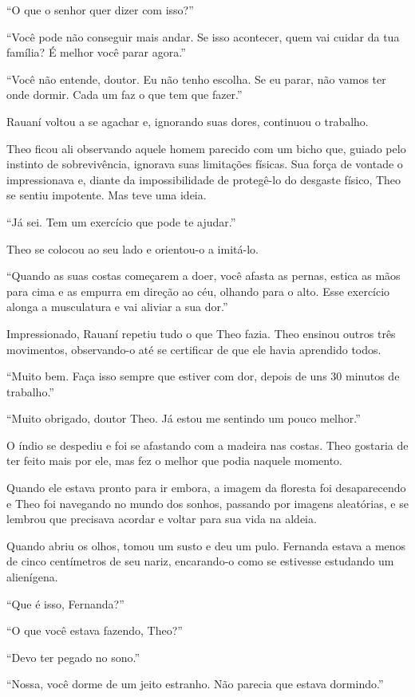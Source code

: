 ``O que o senhor quer dizer com isso?''

``Você pode não conseguir mais andar. Se isso acontecer, quem vai cuidar
da tua família? É melhor você parar agora.''

``Você não entende, doutor. Eu não tenho escolha. Se eu parar, não vamos
ter onde dormir. Cada um faz o que tem que fazer.''

Rauaní voltou a se agachar e, ignorando suas dores, continuou o
trabalho.

Theo ficou ali observando aquele homem parecido com um bicho que, guiado
pelo instinto de sobrevivência, ignorava suas limitações físicas. Sua
força de vontade o impressionava e, diante da impossibilidade de
protegê-lo do desgaste físico, Theo se sentiu impotente. Mas teve uma
ideia.

``Já sei. Tem um exercício que pode te ajudar.''

Theo se colocou ao seu lado e orientou-o a imitá-lo.

``Quando as suas costas começarem a doer, você afasta as pernas, estica
as mãos para cima e as empurra em direção ao céu, olhando para o alto.
Esse exercício alonga a musculatura e vai aliviar a sua dor.''

Impressionado, Rauaní repetiu tudo o que Theo fazia. Theo ensinou outros
três movimentos, observando-o até se certificar de que ele havia
aprendido todos.

``Muito bem. Faça isso sempre que estiver com dor, depois de uns 30
minutos de trabalho.''

``Muito obrigado, doutor Theo. Já estou me sentindo um pouco melhor.''

O índio se despediu e foi se afastando com a madeira nas costas. Theo
gostaria de ter feito mais por ele, mas fez o melhor que podia naquele
momento.

Quando ele estava pronto para ir embora, a imagem da floresta foi
desaparecendo e Theo foi navegando no mundo dos sonhos, passando por
imagens aleatórias, e se lembrou que precisava acordar e voltar para sua
vida na aldeia.

Quando abriu os olhos, tomou um susto e deu um pulo. Fernanda estava a
menos de cinco centímetros de seu nariz, encarando-o como se estivesse
estudando um alienígena.

``Que é isso, Fernanda?''

``O que você estava fazendo, Theo?''

``Devo ter pegado no sono.''

``Nossa, você dorme de um jeito estranho. Não parecia que estava
dormindo.''

